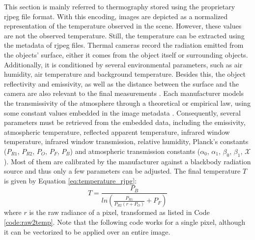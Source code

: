 This section is mainly referred to thermography stored using the proprietary \acrshort{rjpeg} file format. With this encoding, images are depicted as a normalized representation of the temperature observed in the scene. However, these values are not the observed temperature. Still, the temperature can be extracted using the metadata of \acrshort{rjpeg} files. Thermal cameras record the radiation emitted from the objects' surface, either it comes from the object itself or surrounding objects. Additionally, it is conditioned by several environmental parameters, such as air humidity, air temperature and background temperature. Besides this, the object reflectivity and emissivity, as well as the distance between the surface and the camera are also relevant to the final measurements \cite{vollmer_infrared_2017}. Each manufacturer models the transmissivity of the atmosphere through a theoretical or empirical law, using some constant values embedded in the image metadata \cite{teza_evaluation_2019}. Consequently, several parameters must be retrieved from the embedded data, including the emissivity, atmospheric temperature, reflected apparent temperature, infrared window temperature, infrared window transmission, relative humidity, Planck's constants ($P_{R1}$, $P_{R2}$, $P_O$, $P_F$, $P_B$) and atmospheric transmission constants ($\alpha_0$, $\alpha_1$, $\beta_0$, $\beta_1$, $\mathcal{X}$). Most of them are calibrated by the manufacturer against a blackbody radiation source and thus only a few parameters can be adjusted. The final temperature $T$ is given by Equation \ref{eq:temperature_rjpg}:
\begin{equation}
    \label{eq:temperature_rjpg}
    T = \frac{P_B}{ln\left(\frac{P_{R1}}{P_{R2} (\textit{r} + P_O)} + P_F\right)}
\end{equation}
where $\textit{r}$ is the raw radiance of a pixel, transformed as listed in Code \ref{code:raw2temp}. Note that the following code works for a single pixel, although it can be vectorized to be applied over an entire image. 

